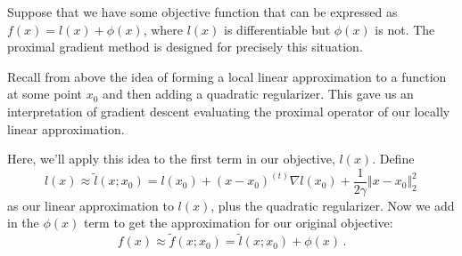 \documentclass{mynotes}
\newcommand{\enorm}[1]{\Vert #1 \Vert_2}
\begin{document}
Suppose that we have some objective function that can be expressed as $f(x) = l(x) + \phi(x)$, where $l(x)$ is differentiable but $\phi(x)$ is not.  The proximal gradient method is designed for precisely this situation.

Recall from above the idea of forming a local linear approximation to a function at some point $x_0$ and then adding a quadratic regularizer.  This gave us an interpretation of gradient descent evaluating the proximal operator of our locally linear approximation.

Here, we'll apply this idea to the first term in our objective, $l(x)$. Define
$$
l(x) \approx \tilde{l}(x; x_0) = l(x_0) + (x - x_0)^{(t)} \nabla l(x_0) + \frac{1}{2\gamma} \enorm{x - x_0}^2 \, 
$$
as our linear approximation to $l(x)$, plus the quadratic regularizer.  Now we add in the $\phi(x)$ term to get the approximation for our original objective:
\begin{equation}
\label{eqn:pg_approx}
f(x) \approx \tilde{f}(x; x_0) = \tilde{l}(x; x_0) + \phi(x)   \, .
\end{equation}
\end{document}

